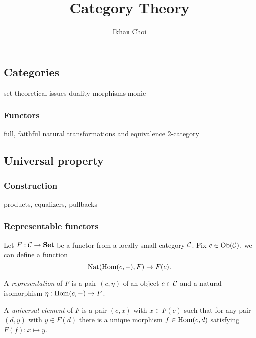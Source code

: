 \documentclass{../../large}
\newcommand{\Set}{\mathbf{Set}}
\begin{document}
\title{Category Theory}
\author{Ikhan Choi}
\maketitle
\tableofcontents


\part{}

\chapter{Categories}
set theoretical issues
duality
morphisms
	monic
\section{Functors}
full, faithful
natural transformations and equivalence
2-category






\chapter{Universal property}

\section{Construction}
products, equalizers, pullbacks

\section{Representable functors}

\begin{prb}
Let $F:\cC\to\Set$ be a functor from a locally small category $\mathcal{C}$.
Fix $c\in\operatorname{Ob}(\mathcal{C})$.
 we can define a function
\[\operatorname{Nat}(\operatorname{Hom}(c,-),F)\to F(c).\]

A \emph{representation} of $F$ is a pair $(c,\eta)$ of an object $c\in\mathcal{C}$ and a natural isomorphism $\eta:\operatorname{Hom}(c,-)\to F$.

A \emph{universal element} of $F$ is a pair $(c,x)$ with $x\in F(c)$ such that for any pair $(d,y)$ with $y\in F(d)$ there is a unique morphism $f\in\operatorname{Hom}(c,d)$ satisfying $F(f):x\mapsto y$.

\begin{parts}
\item
\end{parts}
\end{prb}
\end{document}
